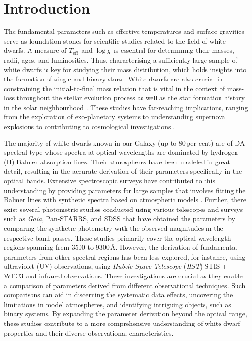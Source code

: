\documentclass[fleqn,usenatbib, useAMS]{mnras}
\newcommand{\Teff}{\mbox{$T_{\mathrm{eff}}$}}
\newcommand{\logg}{\mbox{$\log g$}}
\begin{document}
\section{Introduction}
The fundamental parameters such as effective temperatures and surface gravities serve as foundation stones for scientific studies related to the field of white dwarfs. A measure of \Teff\ and \logg\ is essential for determining their masses, radii, ages, and luminosities. Thus, characterising a sufficiently large sample of white dwarfs is key for studying their mass distribution, which holds insights into the formation of single and binary stars \citep{Finley1997, Bergeron1992, Kepler2007, Tremblay2016}. White dwarfs are also crucial in constraining the initial-to-final mass relation  \citep{Kurtis2004, Raddi2016, Cummings2018} that is vital in the context of mass-loss throughout the stellar evolution process as well as the star formation history in the solar neighbourhood \citep{Elena2023}. These studies have far-reaching implications, ranging from the exploration of exo-planetary systems \citep{boris2019,bonsor2023} to understanding supernova explosions \citep{supernova, Greiner:2023viw} to contributing to cosmological investigations \citep{doi:10.1126/science.abd1714}. 

The majority of white dwarfs known in our Galaxy (up to 80\,per cent) are of DA spectral type whose spectra at optical wavelengths are dominated by hydrogen (H) Balmer absorption lines. Their atmospheres have been modeled in great detail, resulting in the accurate derivation of their parameters specifically in the optical bands. Extensive spectroscopic surveys have contributed to this understanding by providing parameters for large samples that involves fitting the Balmer lines with synthetic spectra based on atmospheric models \citep{Bergeron1992,Finley1997, Marsh1997,Koester2009,Gianninas2011,Tremblay2011,Kepler2019, genest2019}. Further, there exist several photometric studies conducted using various telescopes and surveys such as \textit{Gaia}, Pan-STARRS, and SDSS \citep{Tremblay2019_param, Bergeron2019, Kilic2020, nicola2021, Esteban2022} that have obtained the parameters by comparing the synthetic photometry with the observed magnitudes in the respective band-passes. These studies primarily cover the optical wavelength regions spanning from 3500 to 9300\,\AA. However, the derivation of fundamental parameters from other spectral regions has been less explored, for instance, \cite{Lajoie2007, Wall2023} using ultraviolet (UV) observations, \cite{nicola2020} using \textit{Hubble Space Telescope} (\textit{HST}) STIS + WFC3 and infrared observations. These investigations are crucial as they enable a comparison of parameters derived from different observational techniques. Such comparisons can aid in discerning the systematic data effects, uncovering the limitations in model atmospheres, and identifying intriguing objects, such as binary systems. By expanding the parameter derivation beyond the optical range, these studies contribute to a more comprehensive understanding of white dwarf properties and their diverse observational characteristics.
\end{document}
